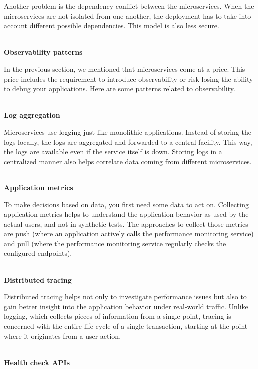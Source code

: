 Another problem is the dependency conflict between the microservices. When the microservices are not isolated from one another, the deployment has to take into account different possible dependencies. This model is also less secure.

\hspace*{\fill} \\ %
\noindent
\textbf{Observability patterns}

In the previous section, we mentioned that microservices come at a price. This price includes the requirement to introduce observability or risk losing the ability to debug your applications. Here are some patterns related to observability.

\hspace*{\fill} \\ %
\noindent
\textbf{Log aggregation}

Microservices use logging just like monolithic applications. Instead of storing the logs locally, the logs are aggregated and forwarded to a central facility. This way, the logs are available even if the service itself is down. Storing logs in a centralized manner also helps correlate data coming from different microservices.

\hspace*{\fill} \\ %
\noindent
\textbf{Application metrics}

To make decisions based on data, you first need some data to act on. Collecting application metrics helps to understand the application behavior as used by the actual users, and not in synthetic tests. The approaches to collect those metrics are push (where an application actively calls the performance monitoring service) and pull (where the performance monitoring service regularly checks the configured endpoints).

\hspace*{\fill} \\ %
\noindent
\textbf{Distributed tracing}

Distributed tracing helps not only to investigate performance issues but also to gain better insight into the application behavior under real-world traffic. Unlike logging, which collects pieces of information from a single point, tracing is concerned with the entire life cycle of a single transaction, starting at the point where it originates from a user action.

\hspace*{\fill} \\ %
\noindent
\textbf{Health check APIs}

